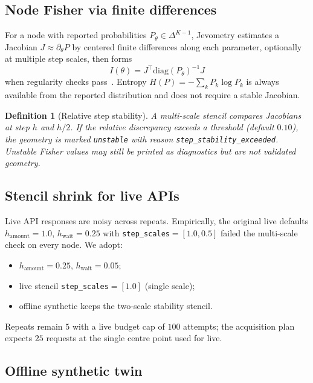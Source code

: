 \documentclass[11pt,a4paper]{article}
\newtheorem{definition}{Definition}
\begin{document}
\subsection{Node Fisher via finite differences}

For a node with reported probabilities $P_\theta\in\Delta^{K-1}$, Jevometry
estimates a Jacobian $J\approx\partial_\theta P$ by centered finite differences
along each parameter, optionally at multiple step scales, then forms
\begin{equation}
  I(\theta)=J^\top \mathrm{diag}(P_\theta)^{-1} J
\end{equation}
when regularity checks pass~\citep{jevometry2026}. Entropy
$H(P)=-\sum_k P_k\log P_k$ is always available from the reported distribution
and does not require a stable Jacobian.

\begin{definition}[Relative step stability]
A multi-scale stencil compares Jacobians at step $h$ and $h/2$. If the
relative discrepancy exceeds a threshold (default $0.10$), the geometry is
marked \texttt{unstable} with reason \texttt{step\_stability\_exceeded}.
Unstable Fisher values may still be printed as diagnostics but are not
validated geometry.
\end{definition}

\subsection{Stencil shrink for live APIs}

Live API responses are noisy across repeats. Empirically, the original live
defaults $h_{\mathrm{amount}}{=}1.0$, $h_{\mathrm{wait}}{=}0.25$ with
\texttt{step\_scales}$=[1.0,0.5]$ failed the multi-scale check on every node.
We adopt:
\begin{itemize}
  \item $h_{\mathrm{amount}}{=}0.25$, $h_{\mathrm{wait}}{=}0.05$;
  \item live stencil \texttt{step\_scales}$=[1.0]$ (single scale);
  \item offline synthetic keeps the two-scale stability stencil.
\end{itemize}
Repeats remain $5$ with a live budget cap of $100$ attempts; the acquisition
plan expects $25$ requests at the single centre point used for live.

\subsection{Offline synthetic twin}
\end{document}
